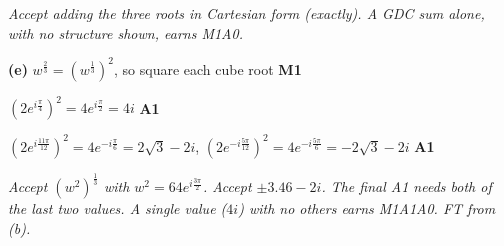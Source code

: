 \documentclass[12pt, twoside]{article}
\begin{document}
\begin{enumerate}[itemsep=0.3cm]
\emph{Accept adding the three roots in Cartesian form (exactly). A GDC sum
alone, with no structure shown, earns M1A0.}

\textbf{(e)} $w^{\frac{2}{3}} = \left(w^{\frac{1}{3}}\right)^{2}$, so
square each cube root \hfill \textbf{M1}

$\left(2e^{i\frac{\pi}{4}}\right)^{2} = 4e^{i\frac{\pi}{2}} = 4i$
\hfill \textbf{A1}

$\left(2e^{i\frac{11\pi}{12}}\right)^{2} = 4e^{-i\frac{\pi}{6}}
= 2\sqrt{3} - 2i$, \quad
$\left(2e^{-i\frac{5\pi}{12}}\right)^{2} = 4e^{-i\frac{5\pi}{6}}
= -2\sqrt{3} - 2i$ \hfill \textbf{A1}

\emph{Accept $\left(w^{2}\right)^{\frac{1}{3}}$ with $w^{2} = 64e^{i\frac{3\pi}{2}}$.
Accept $\pm 3.46 - 2i$. The final A1 needs both of the last two values. A
single value ($4i$) with no others earns M1A1A0. FT from (b).}

\end{enumerate}
\end{document}
